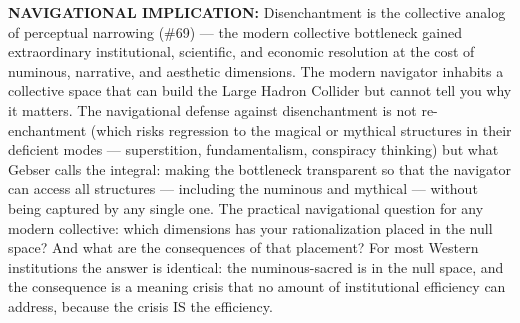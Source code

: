 \textbf{NAVIGATIONAL IMPLICATION:} Disenchantment is the collective analog of perceptual narrowing (\#69) — the modern collective bottleneck gained extraordinary institutional, scientific, and economic resolution at the cost of numinous, narrative, and aesthetic dimensions. The modern navigator inhabits a collective space that can build the Large Hadron Collider but cannot tell you why it matters. The navigational defense against disenchantment is not re-enchantment (which risks regression to the magical or mythical structures in their deficient modes — superstition, fundamentalism, conspiracy thinking) but what Gebser calls the integral: making the bottleneck transparent so that the navigator can access all structures — including the numinous and mythical — without being captured by any single one. The practical navigational question for any modern collective: which dimensions has your rationalization placed in the null space? And what are the consequences of that placement? For most Western institutions the answer is identical: the numinous-sacred is in the null space, and the consequence is a meaning crisis that no amount of institutional efficiency can address, because the crisis IS the efficiency.


\bigskip\noindent\makebox[\textwidth]{\color{rulegray}\rule{5cm}{0.3pt}}\bigskip
